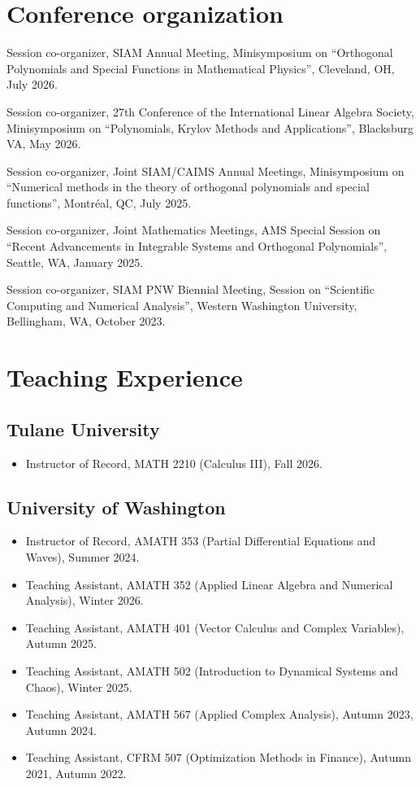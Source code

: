 \documentclass{cv_style}
\begin{document}
	\section{Conference organization}
	\begin{etaremune}
		\item Session co-organizer, SIAM Annual Meeting, Minisymposium on ``Orthogonal Polynomials and Special Functions in Mathematical Physics'', Cleveland, OH, July 2026.
		\item Session co-organizer, 27th Conference of the International Linear Algebra Society, Minisymposium on ``Polynomials, Krylov Methods and Applications'', Blacksburg VA, May 2026.
		\item Session co-organizer, Joint SIAM/CAIMS Annual Meetings, Minisymposium on ``Numerical methods in the theory of orthogonal polynomials and special functions'', Montr\'eal, QC, July 2025.
		\item Session co-organizer, Joint Mathematics Meetings, AMS Special Session on ``Recent Advancements in Integrable Systems and Orthogonal Polynomials'', Seattle, WA, January 2025.
		\item Session co-organizer, SIAM PNW Biennial Meeting, Session on ``Scientific Computing and Numerical Analysis'', Western Washington University, Bellingham, WA, October 2023.
	\end{etaremune}
		
	\section{Teaching Experience}
		\subsection{Tulane University}
		\begin{itemize}
			\item Instructor of Record, MATH 2210 (Calculus III), Fall 2026.
		\end{itemize}
		\subsection{University of Washington}
		\begin{itemize}
			\item Instructor of Record, AMATH 353 (Partial Differential Equations and Waves), Summer 2024.
			\item Teaching Assistant, AMATH 352 (Applied Linear Algebra and Numerical Analysis), Winter 2026.
			\item Teaching Assistant, AMATH 401 (Vector Calculus and Complex Variables), Autumn 2025.
			\item Teaching Assistant, AMATH 502 (Introduction to Dynamical Systems and Chaos), Winter 2025.
			\item Teaching Assistant, AMATH 567 (Applied Complex Analysis), Autumn 2023, Autumn 2024.
			\item Teaching Assistant, CFRM 507 (Optimization Methods in Finance), Autumn 2021, Autumn 2022.
		\end{itemize}
\end{document}
